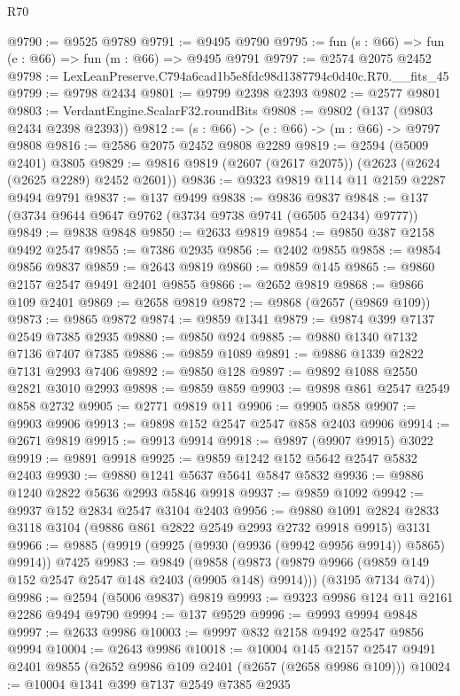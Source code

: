 \begin{lexlean}{R70}
\begin{coremodule}
@9790 := @9525 @9789
@9791 := @9495 @9790
@9795 := fun (s : @66) => fun (e : @66) => fun (m : @66) => @9495 @9791
@9797 := @2574 @2075 @2452
@9798 := LexLeanPreserve.C794a6cad1b5e8fdc98d1387794c0d40c.R70.__fits_45
@9799 := @9798 @2434
@9801 := @9799 @2398 @2393
@9802 := @2577 @9801
@9803 := VerdantEngine.ScalarF32.roundBits
@9808 := @9802 (@137 (@9803 @2434 @2398 @2393))
@9812 := (s : @66) -> (e : @66) -> (m : @66) -> @9797 @9808
@9816 := @2586 @2075 @2452 @9808 @2289
@9819 := @2594 (@5009 @2401) @3805
@9829 := @9816 @9819 (@2607 (@2617 @2075)) (@2623 (@2624 (@2625 @2289) @2452 @2601))
@9836 := @9323 @9819 @114 @11 @2159 @2287 @9494 @9791
@9837 := @137 @9499
@9838 := @9836 @9837
@9848 := @137 (@3734 @9644 @9647 @9762 (@3734 @9738 @9741 (@6505 @2434) @9777))
@9849 := @9838 @9848
@9850 := @2633 @9819
@9854 := @9850 @387 @2158 @9492 @2547
@9855 := @7386 @2935
@9856 := @2402 @9855
@9858 := @9854 @9856 @9837
@9859 := @2643 @9819
@9860 := @9859 @145
@9865 := @9860 @2157 @2547 @9491 @2401 @9855
@9866 := @2652 @9819
@9868 := @9866 @109 @2401
@9869 := @2658 @9819
@9872 := @9868 (@2657 (@9869 @109))
@9873 := @9865 @9872
@9874 := @9859 @1341
@9879 := @9874 @399 @7137 @2549 @7385 @2935
@9880 := @9850 @924
@9885 := @9880 @1340 @7132 @7136 @7407 @7385
@9886 := @9859 @1089
@9891 := @9886 @1339 @2822 @7131 @2993 @7406
@9892 := @9850 @128
@9897 := @9892 @1088 @2550 @2821 @3010 @2993
@9898 := @9859 @859
@9903 := @9898 @861 @2547 @2549 @858 @2732
@9905 := @2771 @9819 @11
@9906 := @9905 @858
@9907 := @9903 @9906
@9913 := @9898 @152 @2547 @2547 @858 @2403 @9906
@9914 := @2671 @9819
@9915 := @9913 @9914
@9918 := @9897 (@9907 @9915) @3022
@9919 := @9891 @9918
@9925 := @9859 @1242 @152 @5642 @2547 @5832 @2403
@9930 := @9880 @1241 @5637 @5641 @5847 @5832
@9936 := @9886 @1240 @2822 @5636 @2993 @5846 @9918
@9937 := @9859 @1092
@9942 := @9937 @152 @2834 @2547 @3104 @2403
@9956 := @9880 @1091 @2824 @2833 @3118 @3104 (@9886 @861 @2822 @2549 @2993 @2732 @9918 @9915) @3131
@9966 := @9885 (@9919 (@9925 (@9930 (@9936 (@9942 @9956 @9914)) @5865) @9914)) @7425
@9983 := @9849
    (@9858
      (@9873 (@9879 @9966 (@9859 @149 @152 @2547 @2547 @148 @2403 (@9905 @148) @9914)))
      (@3195 @7134 @74))
@9986 := @2594 (@5006 @9837) @9819
@9993 := @9323 @9986 @124 @11 @2161 @2286 @9494 @9790
@9994 := @137 @9529
@9996 := @9993 @9994 @9848
@9997 := @2633 @9986
@10003 := @9997 @832 @2158 @9492 @2547 @9856 @9994
@10004 := @2643 @9986
@10018 := @10004
    @145
    @2157
    @2547
    @9491
    @2401
    @9855
    (@2652 @9986 @109 @2401 (@2657 (@2658 @9986 @109)))
@10024 := @10004 @1341 @399 @7137 @2549 @7385 @2935

\end{coremodule}
\end{lexlean}
